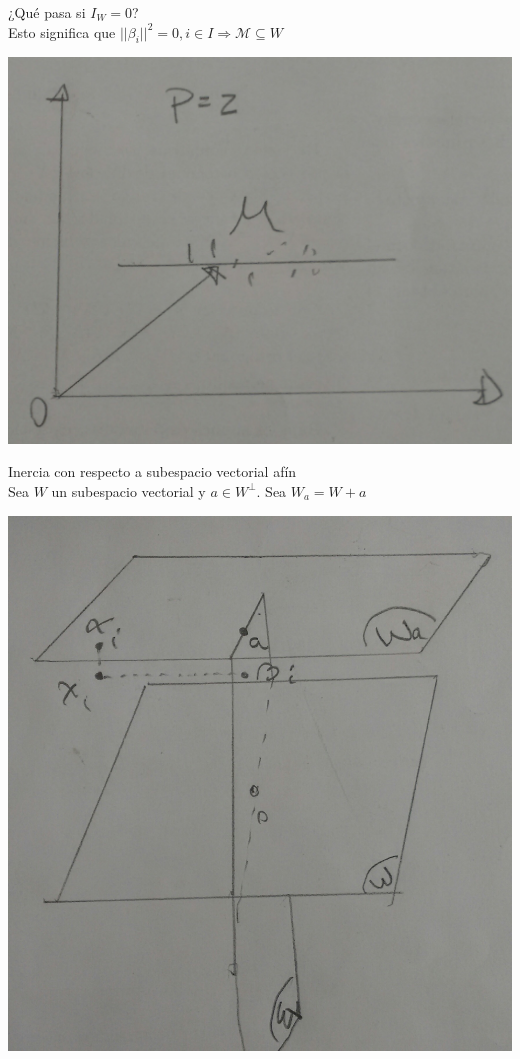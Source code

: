 \documentclass[10pt]{article}
\theoremstyle{plain}
\theoremstyle{definition}
\begin{document}
¿Qué pasa si $I_{W} = 0$?\\

Esto significa que $||\beta_{i}||^2 = 0, i \in I \Rightarrow \mathcal{M} \subseteq W$
\begin{center}
\includegraphics[scale=0.1]{imagenes/afin.jpg}
\end{center}

Inercia con respecto a subespacio vectorial afín\\
Sea $W$ un subespacio vectorial y $a \in W^{\perp}$. Sea $W_{a} = W + a$
\begin{center}
\includegraphics[scale=0.1]{imagenes/descomposicionafin.jpg}
\end{center}
\end{document}
